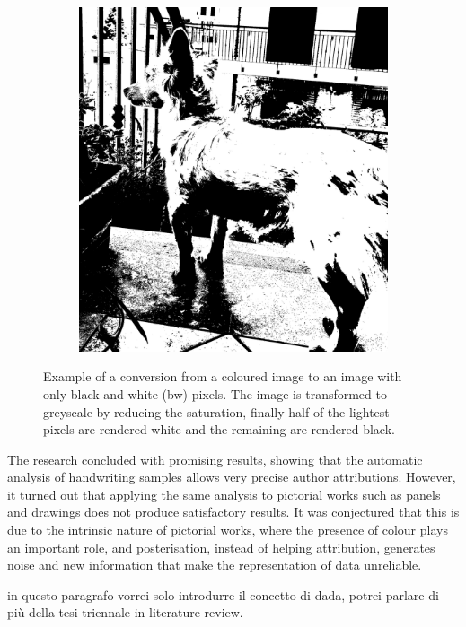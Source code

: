 \begin{figure}[ht]
\begin{subfigure}{0.4\linewidth}
		\includegraphics[width=\linewidth]{Figures/example_bw.jpeg}
	\end{subfigure}
	\caption[Example of conversion from RGB to BW]{Example of a conversion from a coloured image to an image with only black and white (bw) pixels. The image is transformed to greyscale by reducing the saturation, finally half of the lightest pixels are rendered white and the remaining are rendered black.}
	\label{fig:example_bw}
\end{figure}

\noindent The research concluded with promising results, showing that the automatic analysis of handwriting samples allows very precise author attributions. However, it turned out that applying the same analysis to pictorial works such as panels and drawings does not produce satisfactory results. It was conjectured that this is due to the intrinsic nature of pictorial works, where the presence of colour plays an important role, and posterisation, instead of helping attribution, generates noise and new information that make the representation of data unreliable.

\begin{note}
	in questo paragrafo vorrei solo introdurre il concetto di dada, potrei parlare di più della tesi triennale in literature review.
\end{note}


